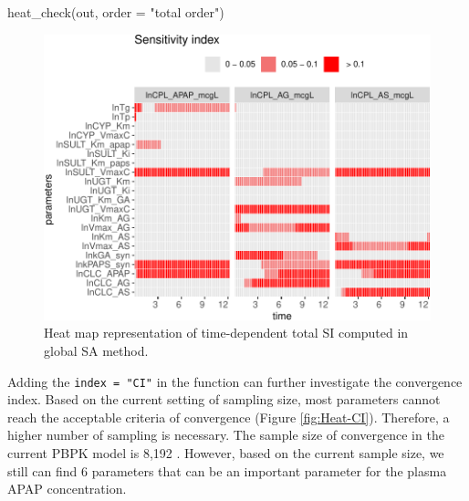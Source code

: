 \begin{Schunk}
\begin{Sinput}
heat_check(out, order = "total order")
\end{Sinput}
\begin{figure}

{\centering \includegraphics[width=0.8\linewidth]{RJ-pksensi_files/figure-latex/unnamed-chunk-31-1} 

}

\caption{\label{fig:Heat-SI}Heat map representation of time-dependent total SI computed in global SA method.}\label{fig:unnamed-chunk-31}
\end{figure}
\end{Schunk}

Adding the \texttt{index\ =\ "CI"} in the function can further
investigate the convergence index. Based on the current setting of
sampling size, most parameters cannot reach the acceptable criteria of
convergence (Figure \ref{fig:Heat-CI}). Therefore, a higher number of
sampling is necessary. The sample size of convergence in the current
PBPK model is 8,192 \citep{fphar201800588}. However, based on the
current sample size, we still can find 6 parameters that can be an
important parameter for the plasma APAP concentration.

